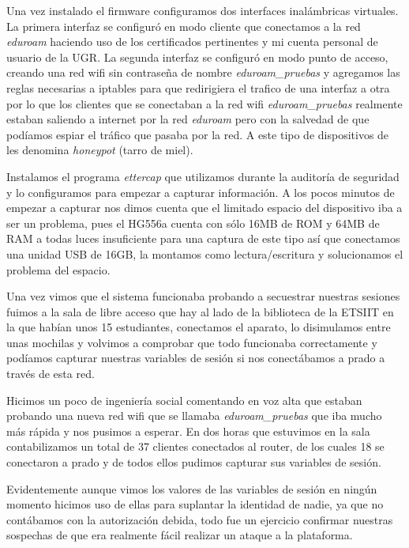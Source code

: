 \bigskip
Una vez instalado el firmware configuramos dos interfaces inalámbricas virtuales. La primera interfaz se configuró en modo cliente que conectamos a la red \textit{eduroam} haciendo uso de los certificados pertinentes y mi cuenta personal de usuario de la UGR. La segunda interfaz se configuró en modo punto de acceso, creando una red wifi sin contraseña de nombre \textit{eduroam\_pruebas} y agregamos las reglas necesarias a iptables para que redirigiera el trafico de una interfaz a otra por lo que los clientes que se conectaban a la red wifi \textit{eduroam\_pruebas} realmente estaban saliendo a internet por la red \textit{eduroam} pero con la salvedad de que podíamos espiar el tráfico que pasaba por la red. A este tipo de dispositivos de les denomina \textit{honeypot} (tarro de miel).

\bigskip
Instalamos el programa \textit{ettercap} que utilizamos durante la auditoría de seguridad y lo configuramos para empezar a capturar información. A los pocos minutos de empezar a capturar nos dimos cuenta que el limitado espacio del dispositivo iba a ser un problema, pues el HG556a cuenta con sólo 16MB de ROM y 64MB de RAM a todas luces insuficiente para una captura de este tipo así que conectamos una unidad USB de 16GB, la montamos como lectura/escritura y solucionamos el problema del espacio.

\bigskip
Una vez vimos que el sistema funcionaba probando a secuestrar nuestras sesiones fuimos a la sala de libre acceso que hay al lado de la biblioteca de la ETSIIT en la que habían unos 15 estudiantes, conectamos el aparato, lo disimulamos entre unas mochilas y volvimos a comprobar que todo funcionaba correctamente y podíamos capturar nuestras variables de sesión si nos conectábamos a prado a través de esta red.

\bigskip
Hicimos un poco de ingeniería social comentando en voz alta que estaban probando una nueva red wifi que se llamaba \textit{eduroam\_pruebas} que iba mucho más rápida y nos pusimos a esperar. En dos horas que estuvimos en la sala contabilizamos un total de 37 clientes conectados al router, de los cuales 18 se conectaron a prado y de todos ellos pudimos capturar sus variables de sesión.

\bigskip
Evidentemente aunque vimos los valores de las variables de sesión en ningún momento hicimos uso de ellas para suplantar la identidad de nadie, ya que no contábamos con la autorización debida, todo fue un ejercicio confirmar nuestras sospechas de que era realmente fácil realizar un ataque a la plataforma.




